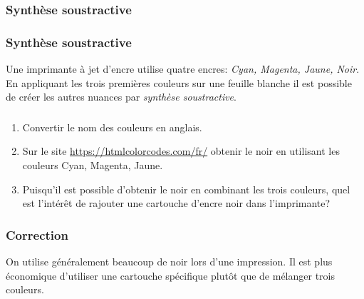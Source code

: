 \documentclass[svgnames,11pt]{beamer}
\begin{document}
\subsubsection{Synthèse soustractive}
\begin{frame}
    \frametitle{Synthèse soustractive}

    Une imprimante à jet d'encre utilise quatre encres: \emph{Cyan, Magenta, Jaune, Noir}. En appliquant les trois premières couleurs sur une feuille blanche il est possible de créer les autres nuances par \emph{synthèse soustractive}.

\end{frame}
\begin{frame}
    \frametitle{}
    \begin{activite}
        \begin{enumerate}
            \item Convertir le nom des couleurs en anglais.
            \item Sur le site \url{https://htmlcolorcodes.com/fr/} obtenir le noir en utilisant les couleurs Cyan, Magenta, Jaune.
            \item Puisqu'il est possible d'obtenir le noir en combinant les trois couleurs, quel est l'intérêt de rajouter une cartouche d'encre noir dans l'imprimante?
        \end{enumerate}
    \end{activite}


\end{frame}
\begin{frame}
    \frametitle{Correction}

On utilise généralement beaucoup de noir lors d'une impression. Il est plus économique d'utiliser une cartouche spécifique plutôt que de mélanger trois couleurs.

\end{frame}
\end{document}
